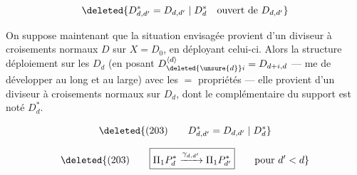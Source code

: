 \[
\deleted{D_{d,d'}^*=D_{d,d'}\mid D_d^*\quad\text{ouvert de }D_{d,d'}}
\]

On suppose maintenant que la situation envisagée provient d'un diviseur à croisements normaux $D$ sur $X=D_0$, en déployant celui-ci. Alors  la structure  déploiement  sur les $D_d$ (en posant $D_{\deleted{\unsure{d}}i}^{\langle d\rangle}=D_{d+i,d}$ ---  me  de développer au long et au large) avec les $=$ propriétés --- elle provient d'un diviseur à croisements normaux  sur $D_d$, dont le complémentaire du support est noté $D_d^*$.

\[
\deleted{(203)\qquad D_{d,d'}^*=D_{d,d'}\mid D_d^*}
\]

\[
\deleted{(203)\qquad\boxed{\Pi_1P_d^*\xrightarrow{\gamma_{d,d'}}\Pi_1P_{d'}^*}\qquad\text{pour }d'<d}
\]
